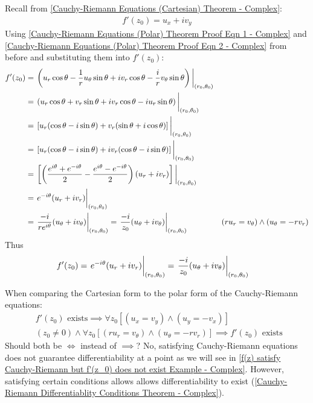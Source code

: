 \documentclass[12pt, english]{book}
\makeatletter
\renewenvironment{proof}[1][\proofname]{\par
	\pushQED{\qed}%
	\normalfont \topsep6\p@\@plus6\p@\relax
	\list{}{%
		\settowidth{\leftmargin}{\itshape\proofname:\hskip\labelsep}%
		\setlength{\labelwidth}{0pt}%
		\setlength{\itemindent}{-\leftmargin}%
	}%
	\item[\hskip\labelsep\itshape#1\@addpunct{:}]\ignorespaces
	}{ \popQED\endlist\@endpefalse}
\makeatother
\begin{document}
\begin{proof}
		{\color{Grey}
			Recall from \cref{Cauchy-Riemann Equations (Cartesian) Theorem - Complex}:
			\begin{align*}
				f'(z_0) =  u_x + iv_y
			\end{align*}
			Using \cref{Cauchy-Riemann Equations (Polar) Theorem Proof Eqn 1 - Complex} and \cref{Cauchy-Riemann Equations (Polar) Theorem Proof Eqn 2 - Complex} from before and substituting them into \(f'(z_0)\):
			\begin{align*}
				f'(z_0) &= \eval{\left(u_r \cos\theta - \frac{1}{r}u_\theta \sin\theta + iv_r \cos\theta - \frac{i}{r} v_\theta \sin\theta \right)}_{(r_0, \theta_0)} \\
				&= \eval{\left(u_r \cos\theta + v_r \sin\theta + iv_r \cos\theta -iu_r \sin\theta \right)}_{(r_0, \theta_0)} \\
				&= \eval{\left[u_r(\cos\theta - i\sin\theta) + v_r(\sin\theta + i\cos\theta)\right]}_{(r_0,\theta_0)} \\
				&= \eval{\left[u_r(\cos\theta - i\sin\theta) + i v_r(\cos\theta - i\sin\theta)\right]}_{(r_0,\theta_0)} \\
				&= \eval{\left[\left(\frac{e^{i\theta} + e^{-i \theta}}{2} - \frac{e^{i\theta} - e^{-i \theta}}{2} \right)(u_r+iv_r)\right]}_{(r_0, \theta_0)} \\
				&= \eval{e^{-i\theta}(u_r + iv_r)}_{(r_0,\theta_0)} \\
				&= \eval{\frac{-i}{re^{i\theta}} (u_\theta + iv_\theta)}_{(r_0, \theta_0)}
				 = \eval{\frac{-i}{z_0} (u_\theta + iv_\theta)}_{(r_0, \theta_0)}
					& (ru_r = v_\theta) \land (u_\theta = -rv_r)
			\end{align*}
			Thus
			\begin{align*}
				f'(z_0) &= \eval{e^{-i\theta}(u_r + iv_r)}_{(r_0,\theta_0)} 
						 = \eval{\frac{-i}{z_0} (u_\theta + iv_\theta)}_{(r_0, \theta_0)}
			\end{align*}
		}
		
		
		
	\end{proof}

	\begin{question}
		When comparing the Cartesian form to the polar form of the Cauchy-Riemann equations:
		\begin{align*}
			&f'(z_0) \text{ exists} \implies \forall z_0[(u_x = v_y)\land(u_y = -v_x)] \\
			&(z_0 \neq 0) \land \forall z_0 [(ru_r = v_\theta) \land (u_\theta = -r v_r)]  
				\implies f'(z_0) \text{ exists }
		\end{align*}
		Should both be $\iff$ instead of $\implies$? 
		No, satisfying Cauchy-Riemann equations does not guarantee differentiability at a point as we will see in \cref{f(z) satisfy Cauchy-Riemann but f'(z_0) does not exist Example - Complex}. However, satisfying certain conditions allows allows differentiability to exist (\cref{Cauchy-Riemann Differentiablity Conditions Theorem - Complex}). 
	\end{question}
\end{document}
